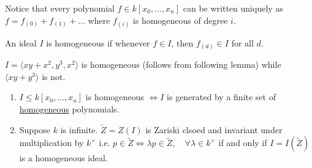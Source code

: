 \documentclass{article}
\begin{document}
Notice that every polynomial $f\in k[x_0, \dotsc, x_n]$ can be written uniquely as $f = f_{(0)} + f_{(1)} + \dotsc$ where $f_{(i)}$ is homogeneous of degree $i$.
\begin{defi}
    An ideal $I$ is homogeneous if whenever $f \in I$, then $f_{(d)} \in I$ for all $d$.
\end{defi}
\begin{eg}
    $I = \langle x y + x^2, y^3 , x^2 \rangle$ is homogeneous (follows from following lemma) while $\langle x y + y^3 \rangle$ is not.
\end{eg}
\begin{lemma} \leavevmode
    \begin{enumerate}[label=(\roman*)]
        \item $I \leq k[x_0, \dotsc, x_n]$ is homogeneous $\iff I$ is generated by a finite set of \hyperlink{def:homPoly}{homogeneous} polynomials.
        \item Suppose $k$ is infinite. $\tilde{Z} = Z(I)$ is Zariski clsoed and invariant under multiplication by $k^\times$ i.e. $p \in \tilde{Z} \iff \lambda p \in \tilde{Z}, \quad \forall \lambda \in k^\times$ if and only if $I = I(\tilde{Z})$ is a homogeneous ideal.
    \end{enumerate}
\end{lemma}
\end{document}
